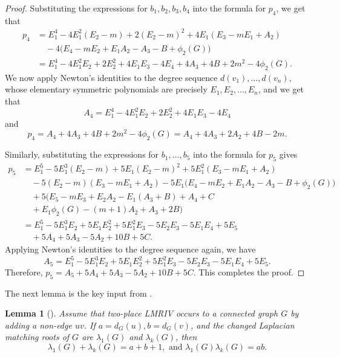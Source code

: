 \documentclass[11pt]{amsart}
\numberwithin{equation}{section}
\newtheorem{lemma}[theorem]{Lemma}
\begin{document}
\begin{proof}
Substituting the expressions for $b_1,b_2,b_3,b_4$ into the formula for $p_4$, we get that
\begin{align*}
p_4 & = E_1^4-4E_1^2(E_2-m)+2(E_2-m)^2+4E_1(E_3-mE_1+A_2) \\
& \quad -4\bigl(E_4-mE_2+E_1A_2-A_3-B+\phi_2(G)\bigr) \\
& = E_1^4-4E_1^2E_2+2E_2^2+4E_1E_3-4E_4+4A_3+4B+2m^2-4\phi_2(G).
\end{align*}
We now apply Newton's identities to the degree sequence
$d(v_1),\dots,d(v_n)$, whose elementary symmetric polynomials are precisely
$E_1,E_2,\dots, E_n$, and we get that 
\begin{equation*}
A_4=E_1^4-4E_1^2E_2+2E_2^2+4E_1E_3-4E_4
\end{equation*}
and 
\[
p_4 = A_4+4A_3+4B+2m^2-4\phi_2(G) 
= A_4+4A_3+2A_2+4B-2m.
\]

Similarly, substituting the expressions for $b_1,\dots,b_5$ into the formula for $p_5$ gives
\begin{align*}
p_5 & = E_1^5-5E_1^3(E_2-m)+5E_1(E_2-m)^2+5E_1^2(E_3-mE_1+A_2) \\
& \quad -5(E_2-m)(E_3-mE_1+A_2) 
-5E_1\bigl(E_4-mE_2+E_1A_2-A_3-B+\phi_2(G)\bigr) \\
& \quad +5\bigl(E_5-mE_3+E_2A_2-E_1(A_3+B)+A_4+C \\
& \quad +E_1\phi_2(G)-(m+1)A_2+A_3+2B\bigr) \\
& = E_1^5-5E_1^3E_2+5E_1E_2^2+5E_1^2E_3-5E_2E_3-5E_1E_4+5E_5 \\
& \quad +5A_4+5A_3-5A_2+10B+5C.
\end{align*}
Applying Newton's identities to the degree sequence again, we have
\[
A_5=E_1^5-5E_1^3E_2+5E_1E_2^2+5E_1^2E_3-5E_2E_3-5E_1E_4+5E_5.
\]
Therefore, $p_5=A_5+5A_4+5A_3-5A_2+10B+5C$.
This completes the proof.
\end{proof}

The next lemma is the key input from \cite{WCC}.

\begin{lemma}[{\cite[Theorem~3.2]{WCC}}]\label{lem:WCC}
Assume that two-place LMRIV occurs to a connected graph $G$ by adding a non-edge $uv$. If $a=d_G(u), b=d_G(v)$,
and the changed Laplacian matching roots of $G$ are $\lambda_1(G)$ and $\lambda_k(G)$, then
\begin{equation}\label{eq:sumprod}
\lambda_1(G)+\lambda_k(G)=a+b+1, \text{ and  }
\lambda_1(G)\lambda_k(G)=ab.
\end{equation}
\end{lemma}
\end{document}
